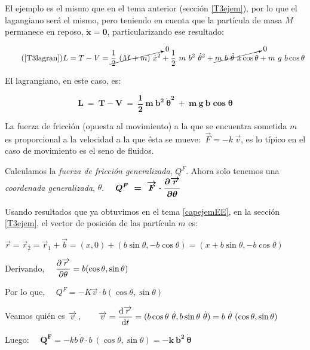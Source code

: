 El ejemplo es el mismo que en el tema anterior (sección \ref{T3ejem}), por lo que el lagangiano será el mismo, pero teniendo en cuenta que la partícula de masa $M$ permanece en reposo, $\boldsymbol{\dot x=0}$,  particularizando ese resultado:

\begin{equation}
\tag{\ref{T3lagran}} 
 L=T-V=  
\cancelto{0}{ \dfrac 1 2 \ (M+m)\ \dot x^2 } + 
 \dfrac 1 2 \ m \ b^2 \ \dot \theta^2 +
 \cancelto{0}{ m \ b \ \dot \theta \ \dot x \cos \theta }+
 m\ g \ b \cos \theta 
\end{equation}

El lagrangiano, en este caso, es:

\begin{equation}
\label{T4lagran-ejem1}
\boldsymbol{ 
 L\ = \ T-V \ = \  \dfrac 1 2 \ m \ b^2 \ \dot \theta^2  \ + \  m\ g \ b \cos \theta 
 }
\end{equation}

La fuerza de fricción (opuesta al movimiento) a la que se encuentra sometida $m$ es proporcional a la velocidad a la que ésta se mueve: $\ \overrightarrow F = - k \ \overrightarrow v$, es lo típico en el caso de movimiento es el seno de fluidos.

Calculamos la \emph{fuerza de fricción generalizada}, $Q^F$. Ahora solo tenemos una \emph{coordenada generalizada}, $\theta$.
$\quad \boldsymbol{ \displaystyle Q^F \ = \ \overrightarrow F \cdot \pdv{\overrightarrow r}{\theta} }$

Usando resultados que ya obtuvimos en el tema \ref{capejemEE}, en la sección \ref{T3ejem}, el vector de posición de las partícula $m$ es:

$\overrightarrow r = \overrightarrow r_2=\overrightarrow r_1+\overrightarrow b= (x,0)+(b\sin \theta,-b \cos \theta)=(x+b\sin \theta,-b \cos \theta)$

Derivando, $\quad \displaystyle \pdv{\overrightarrow r}{\theta}=b(\cos \theta, \sin \theta)$

Por lo que, $\quad \displaystyle Q^F=-K \overrightarrow v \cdot b (\cos \theta, \sin \theta)$

Veamos quién es $\overrightarrow v\, , \qquad \displaystyle \overrightarrow v=\dv{\overrightarrow r}{t}=(b \cos \theta \ \dot \theta, b \sin \theta \ \dot \theta)=b\ \dot \theta \ (\cos \theta, \sin \theta)$

Luego: $\quad \boldsymbol{ Q^F}=-kb\ \dot \theta \cdot b \ (\cos \theta, \sin \theta) =\boldsymbol{ -k\ b^2 \ \dot \theta }$

